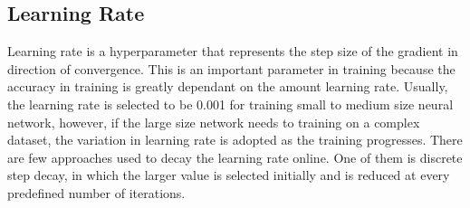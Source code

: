 \subsection{Learning Rate}
Learning rate is a hyperparameter that represents the step size of the gradient in direction of convergence. This is an important parameter in training because the accuracy in training is greatly dependant on the amount learning rate. Usually, the learning rate is selected to be 0.001 for training small to medium size neural network, however, if the large size network needs to training on a complex dataset, the variation in learning rate is adopted as the training progresses. There are few approaches used to decay the learning rate online. One of them is discrete step decay, in which the larger value is selected initially and is reduced at every predefined number of iterations.            


